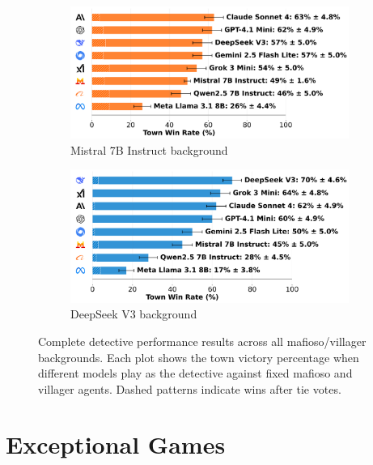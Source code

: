 \documentclass{article}
\begin{document}
\begin{figure}[htbp]
    \begin{subfigure}[b]{0.48\textwidth}
        \centering
        \includegraphics[width=\textwidth]{../results/detective_mistral_7b_instruct_db_benchmark.png}
        \caption{Mistral 7B Instruct background}
        \label{fig:detective_mistral_appendix}
    \end{subfigure}
    \hfill
    \begin{subfigure}[b]{0.48\textwidth}
        \centering
        \includegraphics[width=\textwidth]{../results/detective_deepseek_v3_db_benchmark.png}
        \caption{DeepSeek V3 background}
        \label{fig:detective_deepseek_appendix}
    \end{subfigure}
    \caption{Complete detective performance results across all mafioso/villager backgrounds. Each plot shows the town victory percentage when different models play as the detective against fixed mafioso and villager agents. Dashed patterns indicate wins after tie votes.}
    \label{fig:detective_complete}
\end{figure}

\section{Exceptional Games}
\label{appendix:exceptional_games}
\end{document}
